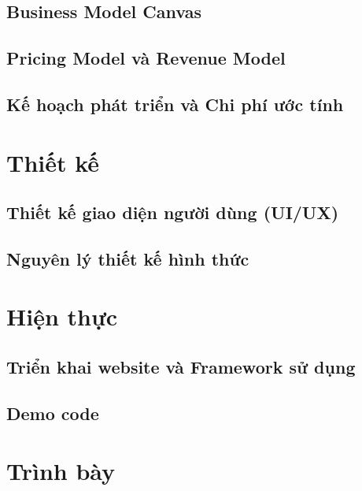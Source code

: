 \documentclass[12pt, a4paper]{report}
\begin{document}
\section{Business Model Canvas}


\section{Pricing Model và Revenue Model}


\section{Kế hoạch phát triển và Chi phí ước tính}


\chapter{Thiết kế}
\label{chap:design}

\section{Thiết kế giao diện người dùng (UI/UX)}


\section{Nguyên lý thiết kế hình thức}


\chapter{Hiện thực}
\label{chap:impl}

\section{Triển khai website và Framework sử dụng}


\section{Demo code}


\chapter{Trình bày}
\label{chap:pres}

\end{document}

